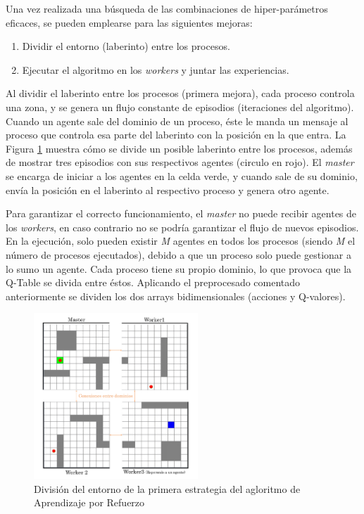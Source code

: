 		

		Una vez realizada una búsqueda de las combinaciones de hiper-parámetros eficaces, se pueden emplearse para las siguientes mejoras:
		
		\begin{enumerate}
			\item Dividir el entorno (laberinto) entre los procesos.
			\item Ejecutar el algoritmo en los \textit{workers} y juntar las experiencias.
		\end{enumerate}

	
		
		Al dividir el laberinto entre los procesos (primera mejora), cada proceso controla una zona, y se genera un flujo constante de episodios (iteraciones del algoritmo). Cuando un agente sale del dominio de un proceso, éste le manda un mensaje al proceso que controla esa parte del laberinto con la posición en la que entra. La Figura \ref{fig:rlmpi} muestra cómo se divide un posible laberinto entre los procesos, además de mostrar tres episodios con sus respectivos agentes (circulo en rojo). El \textit{master} se encarga de iniciar a los agentes en la celda verde, y cuando sale de su dominio, envía la posición en el laberinto al respectivo proceso y genera otro agente. 
		
		Para garantizar el correcto funcionamiento, el \textit{master} no puede recibir agentes de los \textit{workers}, en caso contrario no se podría garantizar el flujo de nuevos episodios. En la ejecución, solo pueden existir \textit{M} agentes en todos los procesos (siendo \textit{M} el número de procesos ejecutados), debido a que un proceso solo puede gestionar a lo sumo un agente. Cada proceso tiene su propio dominio, lo que provoca que la Q-Table se divida entre éstos. Aplicando el preprocesado comentado anteriormente se dividen los dos arrays bidimensionales (acciones y Q-valores). 
		
		
		
		\begin{figure}[!h]
			\centering
			\includegraphics[width=0.55\textwidth]{images/chapter_3/rl_mpi}	
			\caption{División del entorno de la primera estrategia del agloritmo de Aprendizaje por Refuerzo}
			\label{fig:rlmpi}
		\end{figure}
	
